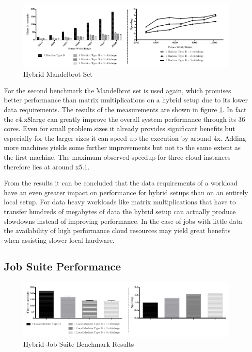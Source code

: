 \begin{figure}[H]	
	\includegraphics[width=1.0\textwidth]{images/hybrid_mandelbrot_performance.pdf}
	\centering
	\caption{Hybrid Mandelbrot Set}
	\label{img:hybrid_mandelbrot}
\end{figure}

For the second benchmark the Mandelbrot set is used again, which promises better performance than matrix multiplications on a hybrid setup due to its lower data requirements. The results of the measurements are shown in figure \ref{img:hybrid_mandelbrot}. In fact the c4.x8large can greatly improve the overall system performance through its 36 cores. Even for small problem sizes it already provides significant benefits but especially for the larger sizes it can speed up the execution by around 4x. Adding more machines yields some further improvements but not to the same extent as the first machine. The maximum observed speedup for three cloud instances therefore lies at around x5.1. 

From the results it can be concluded that the data requirements of a workload have an even greater impact on performance for hybrid setups than on an entirely local setup. For data heavy workloads like matrix multiplications that have to transfer hundreds of megabytes of data the hybrid setup can actually produce slowdowns instead of improving performance. In the case of jobs with little data the availability of high performance cloud resources may yield great benefits when assisting slower local hardware.

\subsection*{Job Suite Performance}

\begin{figure}[H]	
	\includegraphics[width=1.0\textwidth]{images/hybrid_full_benchmark_performance_based.pdf}
	\centering
	\caption{Hybrid Job Suite Benchmark Results}
	\label{img:hybrid_benchmark_results}
\end{figure}

